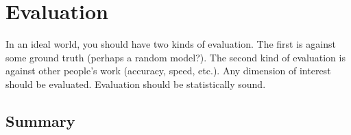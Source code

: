 \chapter{Evaluation}

In an ideal world, you should have two kinds of evaluation.
The first is against some ground truth (perhaps a random model?).
The second kind of evaluation is against other people's work (accuracy, speed, etc.).
Any dimension of interest should be evaluated.
Evaluation should be statistically sound.

\blindtext

\section{Summary}
\blindtext
